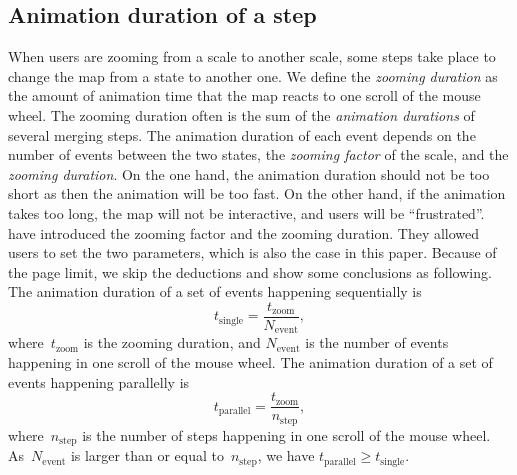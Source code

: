 \documentclass{ica}
\begin{document}


\subsection{Animation duration of a step}
\label{sec:zooming_duration}

When users are zooming from a scale to another scale,
some steps take place to change the map from a state to another one.
We define the \emph{zooming duration} as the amount of 
animation time that the map reacts to one scroll of the mouse wheel.
The zooming duration often is the sum of 
the \emph{animation durations} of several merging steps.
The animation duration of each event depends on 
the number of events between the two states,
the \emph{zooming factor} of the scale, and 
the \emph{zooming duration}.
On the one hand, the animation duration should not be too short 
as then the animation will be too fast. 
On the other hand, if the animation takes too long, 
the map will not be interactive, and users will be ``frustrated''.
\citet[][]{Meijers2020Web} 
have introduced the zooming factor and the zooming duration.
They allowed users to set the two parameters,
which is also the case in this paper.
Because of the page limit, 
we skip the deductions and show some conclusions as following. 
The animation duration of a set of events happening sequentially is
\begin{equation*}
\label{eq:t_single}
t_\mathrm{single} = \frac{t_\mathrm{zoom}}{N_\mathrm{event}},
\end{equation*}
where~$t_\mathrm{zoom}$ is the zooming duration, 
and $N_\mathrm{event}$ is the number of events
happening in one scroll of the mouse wheel.
The animation duration of a set of events happening parallelly is
\begin{equation*}
\label{eq:t_parallel}
t_\mathrm{parallel} = \frac{t_\mathrm{zoom}}{n_\mathrm{step}},
\end{equation*}
where~$n_\mathrm{step}$ is the number of steps
happening in one scroll of the mouse wheel.
As~$N_\mathrm{event}$ is larger than or equal to~$n_\mathrm{step}$,
we have $t_\mathrm{parallel} \ge t_\mathrm{single}$.
\end{document}
